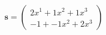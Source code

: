 \documentclass[preview]{standalone}
\begin{document}
\begin{align*}
\mathbf{s} = \begin{pmatrix}2x^{1} + 1x^{2} + 1x^{3} \\ -1 + -1x^{2} + 2x^{3}\end{pmatrix}
\end{align*}
\end{document}
